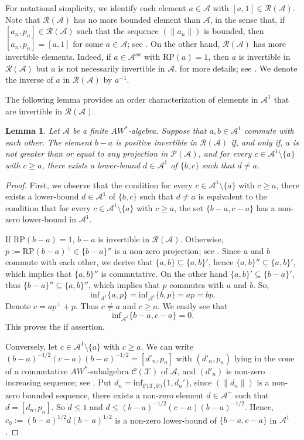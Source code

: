 \documentclass[12pt]{amsart}
\newtheorem{lem}[thm]{Lemma}
\theoremstyle{definition}
\theoremstyle{remark}
\numberwithin{equation}{section}
\begin{document}
For notational simplicity, we identify each element $a\in\mathcal{A}$ with $[a,1]\in\mathcal{R(A)}$. Note that $\mathcal{R(A)}$ has no more bounded element than $\mathcal{A}$, in the sense that, if $[a_n,p_n]\in \mathcal{R(A)}$ such that the sequence $(\|a_n\|)$ is bounded, then $[a_n,p_n]=[a,1]$ for some $a\in \mathcal{A}$; see \cite[Theorem 5.1]{Berberian1}. On the other hand, $\mathcal{R(A)}$ has more invertible elements. Indeed, if $a \in \mathcal{A}^{sa}$ with $ \mathrm{RP}(a) = 1$, then $a$ is invertible in $\mathcal{R(A)}$ but $a$ is not necessarily invertible in $\mathcal{A}$, for more details; see \cite[Corollary 7.5]{Berberian1}.  We denote the inverse of $a$ in $\mathcal{R(A)}$ by $a^{-1}$.

The following lemma provides an order characterization of elements in $\mathcal{A}^1$ that are invertible in $\mathcal{R(A)}$.
\begin{lem}\label{inverse}
	Let $\mathcal{A}$ be a finite $AW^*$-algebra. Suppose that $a,b\in\mathcal{A}^1$ commute with each other. The element $b-a$ is positive invertible in $\mathcal{R(A)}$ if, and only if,  $a$ is not greater than or equal to any projection in $\mathcal{P(A)}$,  and   for every $c\in\mathcal{A}^1\setminus\{a\}$ with $c\geq a$, there exists a lower-bound $d\in\mathcal{A}^1$ of $\{b,c\}$  such that $d\neq a$.  
\end{lem}
\begin{proof}
	First, we observe that the condition  for every $c\in\mathcal{A}^1\setminus\{a\}$ with $c\geq a$, there exists a lower-bound $d\in\mathcal{A}^1$ of $\{b,c\}$  such that $d\neq a$ is equivalent to the condition that     for every $c\in\mathcal{A}^1\setminus\{a\}$ with $c\geq a$, the set  $\{b-a,c-a\}$ has a non-zero lower-bound in $\mathcal{A}^1$. 	
	
	
	If $ \mathrm{RP}(b-a)=1$, $b-a$ is invertible in $\mathcal{R(A)}$. Otherwise, $p:= \mathrm{RP}(b-a)^\perp\in\{b-a\}''$  is a  non-zero projection; see \cite[Corollary 1, p. 17]{Berberian}. Since $a$ and $b$ commute with each other, we derive that $\{a,b\}\subseteq\{a,b\}'$, hence $\{a,b\}''\subseteq\{a,b\}'$, which implies that $\{a,b\}''$ is commutative. On the other hand $\{a,b\}'\subseteq\{b-a\}'$,  thus $\{b-a\}''\subseteq\{a,b\}''$, which implies that $p$ commutes with $a$ and $b$. So, $$\mathrm{inf}_{\mathcal{A}^1}\{a,p\}=\mathrm{inf}_{\mathcal{A}^1}\{b,p\}=ap=bp.$$
	Denote $c=ap^\perp+p$. Thus $c\neq a $  and $c\geq a$. We easily see that $$\mathrm{inf}_{\mathcal{A}^1}\{b-a,c-a\}=0.$$  
	This proves the if assertion.
	
	Conversely,  let $c\in\mathcal{A}^1\setminus\{a\}$ with $c\geq a$. We can write $(b-a)^{-1/2}(c-a)(b-a)^{-1/2}=[d'_n,p_n]$ with $(d'_n,p_n)$  lying in the cone of a commutative $AW^*$-subalgebra $\mathcal{C(X)}$ of $\mathcal{A}$, and  $(d'_n)$ is non-zero  increasing sequence; see \cite[Theorem 4.2]{Berberian1}. Put $d_n=\mathrm{inf}_{\mathcal{C(X},\mathbb{R})}\{1,d_n'\}$,  since $(\|d_n\|)$ is a non-zero bounded sequence, there exists a non-zero element $d\in\mathcal{A}^+$ such that $d=[d_n,p_n]$. So $d \leq 1$ and $d\leq(b-a)^{-1/2}(c-a)(b-a)^{-1/2}$. Hence, $c_0:=(b-a)^{1/2}d(b-a)^{1/2}$ is a non-zero lower-bound of $\{b-a,c-a\}$  in $\mathcal{A}^1$.	
\end{proof}
\end{document}
